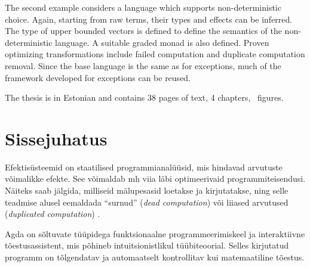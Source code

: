 \documentclass[a4paper,12pt]{article}
\begin{document}
The second example considers a language which supports non-deterministic choice.
Again, starting from raw terms, their types and effects can be inferred.
The type of upper bounded vectors is defined to define the semantics of the non-deterministic language.
A suitable graded monad is also defined.
Proven optimizing transformations include failed computation and duplicate computation removal.
Since the base language is the same as for exceptions, much of the framework developed for exceptions can be reused.

The thesis is in Estonian and contains 38 pages of text, 4 chapters, \totalfigures~figures.
\clearpage\vspace*{0pt}

\tableofcontents

\clearpage\vspace*{0pt}

\listoffigures

\clearpage\vspace*{0pt}

\section{Sissejuhatus}

Efektisüsteemid on staatilised programmianalüüsid, mis hindavad arvutuste võimalikke efekte.
See võimaldab mh viia läbi optimeerivaid programmiteisendusi.
Näiteks saab jälgida, milliseid mälupesasid loetakse ja kirjutatakse, ning selle teadmise alusel eemaldada ``surnud'' (\emph{dead computation}) või liiased arvutused (\emph{duplicated computation}) \cite{Benton2006}.





Agda on sõltuvate tüüpidega funktsionaalne programmeerimiskeel ja interaktiivne tõestusassistent,
mis põhineb intuitsionistlikul tüübiteoorial.
Selles kirjutatud programm on tõlgendatav ja automaatselt kontrollitav kui matemaatiline tõestus.
\end{document}

